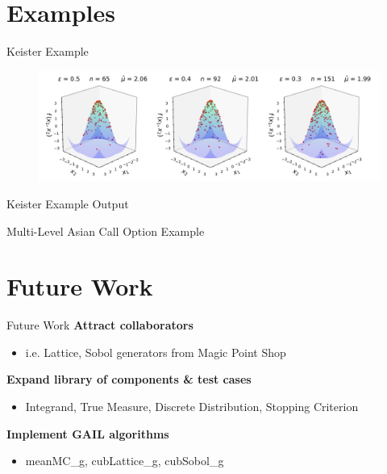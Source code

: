 \documentclass[11pt]{beamer}
\begin{document}
\section{Examples}
\begin{frame}{Keister Example}
    
    \begin{figure}[ht!]
        \centering
        \includegraphics[width=1\textwidth]
            {Figs/Three_3d_SurfaceScatters.png}
        \label{fig:3d_keister}
    \end{figure}
\end{frame}
\begin{frame}{Keister Example Output}
     
\end{frame}
\begin{frame}{Multi-Level Asian Call Option Example \cite{giles2018multilevel}}
     
\end{frame}


\section{Future Work}
\begin{frame}{Future Work}
    \textbf{Attract collaborators}
        \begin{itemize}
            \item i.e. Lattice, Sobol generators from Magic Point Shop \cite{mps}
        \end{itemize}
    \textbf{Expand library of components \& test cases}
        \begin{itemize}
            \item Integrand, True Measure, Discrete Distribution, Stopping Criterion
        \end{itemize}
    \textbf{Implement GAIL algorithms \cite{GAIL}}
    \begin{itemize}
        \item meanMC\_g, cubLattice\_g, cubSobol\_g \cite{mcAuto}
    \end{itemize}
\end{frame}
\end{document}
